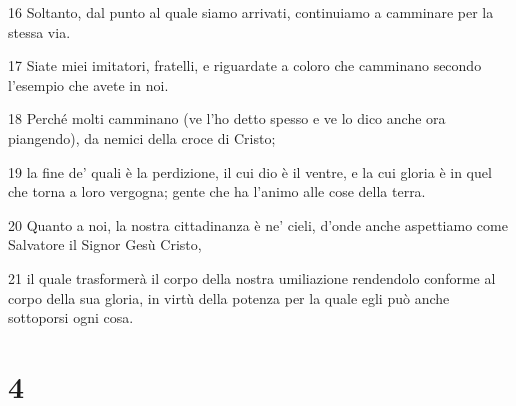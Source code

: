 \par 16 Soltanto, dal punto al quale siamo arrivati, continuiamo a camminare per la stessa via.
\par 17 Siate miei imitatori, fratelli, e riguardate a coloro che camminano secondo l'esempio che avete in noi.
\par 18 Perché molti camminano (ve l'ho detto spesso e ve lo dico anche ora piangendo), da nemici della croce di Cristo;
\par 19 la fine de' quali è la perdizione, il cui dio è il ventre, e la cui gloria è in quel che torna a loro vergogna; gente che ha l'animo alle cose della terra.
\par 20 Quanto a noi, la nostra cittadinanza è ne' cieli, d'onde anche aspettiamo come Salvatore il Signor Gesù Cristo,
\par 21 il quale trasformerà il corpo della nostra umiliazione rendendolo conforme al corpo della sua gloria, in virtù della potenza per la quale egli può anche sottoporsi ogni cosa.

\chapter{4}

